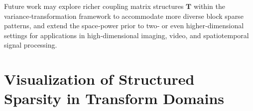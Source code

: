 \documentclass[lettersize,journal]{IEEEtran}
\theoremstyle{remark}
\begin{document}
Future work may explore richer coupling matrix structures $\boldsymbol{T}$ within the variance‑transformation framework to accommodate more diverse block sparse patterns, and extend the space‑power prior to two‑ or even higher‑dimensional settings for applications in high‑dimensional imaging, video, and spatiotemporal signal processing.














 
%
%

\appendices
\section{Visualization of Structured Sparsity in Transform Domains}\label{App:block}
\end{document}
